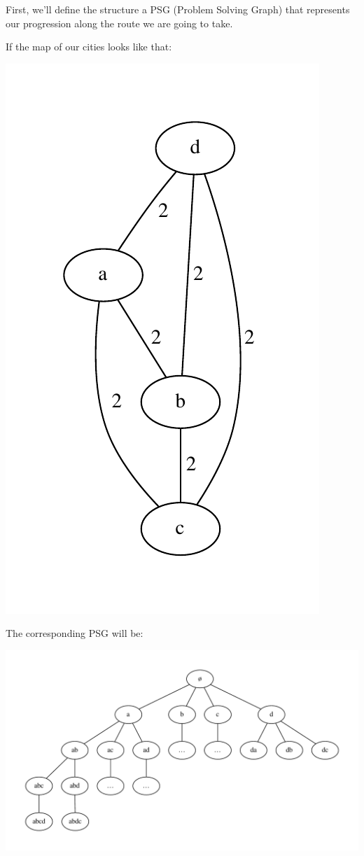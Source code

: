 \documentclass[french]{article}
\begin{document}
First, we'll define the structure a PSG (Problem Solving Graph) that represents
our progression along the route we are going to take.

If the map of our cities looks like that:
\begin{center}
\includegraphics[scale=0.5]{graphs/modeling-the-problem_example1-map.pdf}
\end{center}

The corresponding PSG will be:
\begin{center}
\includegraphics[scale=0.5]{graphs/modeling-the-problem_example1-psg.pdf}
\end{center}
\end{document}
